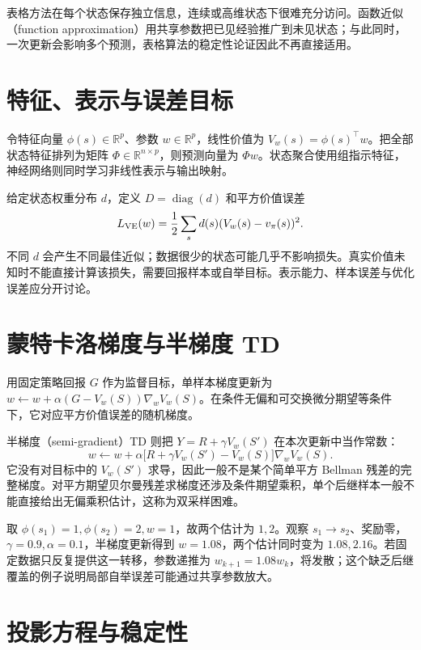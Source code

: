 \documentclass[UTF8,12pt,a4paper,fontset=fandol]{ctexbook}
\begin{document}
表格方法在每个状态保存独立信息，连续或高维状态下很难充分访问。函数近似（function approximation）用共享参数把已见经验推广到未见状态；与此同时，一次更新会影响多个预测，表格算法的稳定性论证因此不再直接适用。

\section{特征、表示与误差目标}

令特征向量 $\phi(s)\in\mathbb R^p$、参数 $w\in\mathbb R^p$，线性价值为 $V_w(s)=\phi(s)^\top w$。把全部状态特征排列为矩阵 $\Phi\in\mathbb R^{n\times p}$，则预测向量为 $\Phi w$。状态聚合使用组指示特征，神经网络则同时学习非线性表示与输出映射。

给定状态权重分布 $d$，定义 $D=\operatorname{diag}(d)$ 和平方价值误差
\[
L_{\rm VE}(w)=\frac12\sum_s d(s)(V_w(s)-v_\pi(s))^2.
\]
不同 $d$ 会产生不同最佳近似；数据很少的状态可能几乎不影响损失。真实价值未知时不能直接计算该损失，需要回报样本或自举目标。表示能力、样本误差与优化误差应分开讨论。

\section{蒙特卡洛梯度与半梯度 TD}

用固定策略回报 $G$ 作为监督目标，单样本梯度更新为 $w\leftarrow w+\alpha(G-V_w(S))\nabla_wV_w(S)$。在条件无偏和可交换微分期望等条件下，它对应平方价值误差的随机梯度。

半梯度（semi-gradient）TD 则把 $Y=R+\gamma V_w(S')$ 在本次更新中当作常数：
\begin{equation}
w\leftarrow w+\alpha\bigl[R+\gamma V_w(S')-V_w(S)\bigr]\nabla_wV_w(S).
\label{eq:rl-semi-gradient}
\end{equation}
它没有对目标中的 $V_w(S')$ 求导，因此一般不是某个简单平方 Bellman 残差的完整梯度。对平方期望贝尔曼残差求梯度还涉及条件期望乘积，单个后继样本一般不能直接给出无偏乘积估计，这称为双采样困难。

\begin{example}[共享参数的影响]
取 $\phi(s_1)=1,\phi(s_2)=2,w=1$，故两个估计为 $1,2$。观察 $s_1\to s_2$、奖励零，$\gamma=0.9,\alpha=0.1$，半梯度更新得到 $w=1.08$，两个估计同时变为 $1.08,2.16$。若固定数据只反复提供这一转移，参数递推为 $w_{k+1}=1.08w_k$，将发散；这个缺乏后继覆盖的例子说明局部自举误差可能通过共享参数放大。
\end{example}

\section{投影方程与稳定性}
\end{document}
